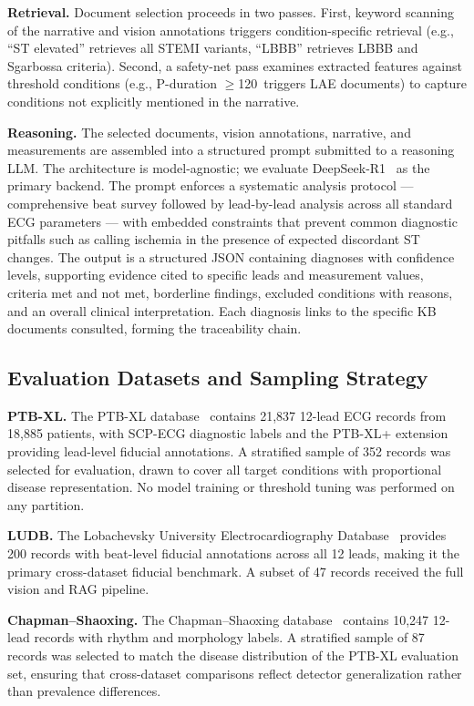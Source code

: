 \documentclass[journal,compsoc]{IEEEtran}
\newcommand{\ms}{\,\text{ms}}
\begin{document}
\textbf{Retrieval.} Document selection proceeds in two passes. First, keyword scanning of the narrative and vision annotations triggers condition-specific retrieval (e.g., ``ST elevated'' retrieves all STEMI variants, ``LBBB'' retrieves LBBB and Sgarbossa criteria). Second, a safety-net pass examines extracted features against threshold conditions (e.g., P-duration $\geq$120\ms{} triggers LAE documents) to capture conditions not explicitly mentioned in the narrative.

\textbf{Reasoning.} The selected documents, vision annotations, narrative, and measurements are assembled into a structured prompt submitted to a reasoning LLM. The architecture is model-agnostic; we evaluate DeepSeek-R1~\cite{deepseek_r1_2025} as the primary backend. The prompt enforces a systematic analysis protocol --- comprehensive beat survey followed by lead-by-lead analysis across all standard ECG parameters --- with embedded constraints that prevent common diagnostic pitfalls such as calling ischemia in the presence of expected discordant ST changes. The output is a structured JSON containing diagnoses with confidence levels, supporting evidence cited to specific leads and measurement values, criteria met and not met, borderline findings, excluded conditions with reasons, and an overall clinical interpretation. Each diagnosis links to the specific KB documents consulted, forming the traceability chain.

\subsection{Evaluation Datasets and Sampling Strategy}
\label{sec:datasets}

\textbf{PTB-XL.} The PTB-XL database~\cite{wagner2020ptbxl} contains 21,837 12-lead ECG records from 18,885 patients, with SCP-ECG diagnostic labels and the PTB-XL+ extension providing lead-level fiducial annotations. A stratified sample of 352 records was selected for evaluation, drawn to cover all target conditions with proportional disease representation. No model training or threshold tuning was performed on any partition.

\textbf{LUDB.} The Lobachevsky University Electrocardiography Database~\cite{kalyakulina2020ludb} provides 200 records with beat-level fiducial annotations across all 12 leads, making it the primary cross-dataset fiducial benchmark. A subset of 47 records received the full vision and RAG pipeline.

\textbf{Chapman--Shaoxing.} The Chapman--Shaoxing database~\cite{zheng2020chapman} contains 10,247 12-lead records with rhythm and morphology labels. A stratified sample of 87 records was selected to match the disease distribution of the PTB-XL evaluation set, ensuring that cross-dataset comparisons reflect detector generalization rather than prevalence differences.
\end{document}
